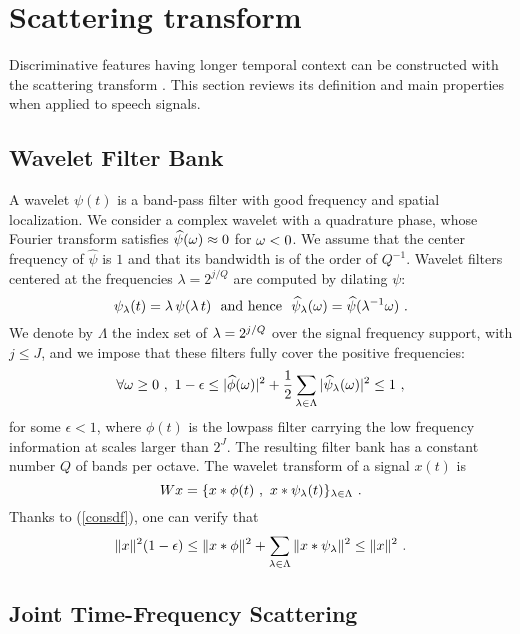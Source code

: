 \section{Scattering transform}
\label{scattsec}

Discriminative features having longer temporal context can be constructed with the 
scattering transform \cite{pami, deepscatt}. 
This section reviews its definition and main properties when applied to speech signals.

\subsection{Wavelet Filter Bank}

A wavelet $\psi (t)$ is a band-pass filter with good frequency and spatial localization.
 We consider a complex wavelet with a quadrature phase, 
whose Fourier transform satisfies
$\widehat \psi({\omega}) \approx 0$ for ${\omega} < 0$.
We assume that the center frequency of $\widehat \psi$ is $1$ and 
that its bandwidth is of the order of $Q^{-1}$. 
Wavelet filters centered
at the frequencies $\lambda = 2^{j/Q}$ are computed by dilating $\psi$:
\begin{equation}
\label{psidilation}
\psi_{\lambda} (t) = {\lambda}\, \psi({\lambda}\, t)~~\mbox{and hence}~~
\widehat \psi_{\lambda} ({\omega}) = \widehat \psi({\lambda}^{-1} \omega)~.
\end{equation}
We denote by $\Lambda$ the index set of ${\lambda} = 2^{j/Q}$ over
the signal frequency support, with $j \leq J$, 
and we impose that these filters fully cover the positive frequencies:
\begin{equation}
\label{consdf}
\forall {\omega} \geq 0~,~ 1- \epsilon 
\leq |\widehat{\phi}(\omega)|^2 + \frac 1 2 \sum_{{\lambda} \in \Lambda} |\widehat{\psi}_{\lambda}(\omega)|^2 \leq 1~,
\end{equation}
for some $\epsilon <1$, where $\phi(t)$ is the lowpass filter carrying the 
low frequency information at scales larger than $2^J$.
The resulting filter bank has a constant number $Q$ of bands per 
octave. The wavelet transform of a signal $x(t)$ is
\[
W x = \{x \ast \phi(t)~,~x \ast \psi_{\lambda}(t)  \}_{{\lambda} \in \Lambda}~.
\]
Thanks to (\ref{consdf}), one can verify that 
\begin{equation}
\label{lp_basic}
\| x \|^2 (1- \epsilon) \leq \| x \ast \phi \|^2 + \sum_{{\lambda} \in \Lambda} \| x \ast \psi_{\lambda} \|^2  \leq \| x \|^2~.
\end{equation}

\subsection{Joint Time-Frequency Scattering}

